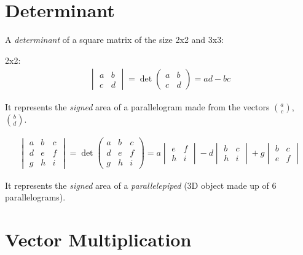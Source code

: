 \documentclass[00_complete]{subfiles}
\begin{document}
\section{Determinant}

A \emph{determinant} of a square matrix of the size 2x2 and 3x3:

2x2:
$$
\begin{gathered}
    \begin{vmatrix}
        a & b \\
        c & d
    \end{vmatrix} = \det \begin{pmatrix}
        a & b \\
        c & d
    \end{pmatrix} = ad - bc
\end{gathered}
$$

It represents the \emph{signed} area of a parallelogram made from the vectors $\binom{a}{c}$,
$\binom{b}{d}$.

$$
\begin{gathered}
    \begin{vmatrix}
        a & b & c \\
        d & e & f \\
        g & h & i
    \end{vmatrix} = \det \begin{pmatrix}
        a & b & c \\
        d & e & f \\
        g & h & i
    \end{pmatrix} = a \begin{vmatrix}
        e & f \\ h & i
    \end{vmatrix} - d \begin{vmatrix}
        b & c \\ h & i
    \end{vmatrix} + g \begin{vmatrix}
        b & c \\ e & f
    \end{vmatrix}
\end{gathered}
$$

It represents the \emph{signed} area of a \emph{parallelepiped} (3D object made up of 6
parallelograms).

\section{Vector Multiplication}
\end{document}
